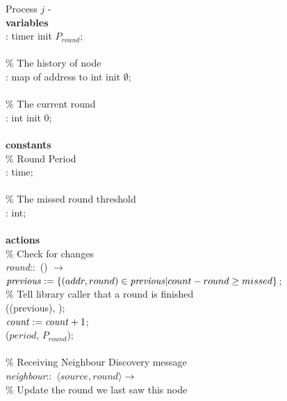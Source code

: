 \begin{figure}
  \centering
  \begin{boxedminipage}{\linewidth}
    \null Process $j$ - \\
    \null \textbf{variables}\\
    \null\qq {}: timer init $P_{round}$;\\~\\
    \null\qq \% The history of node\\
    \null\qq {}: map of address to int init $\emptyset$;\\~\\
    \null\qq \% The current round\\
    \null\qq {}: int init 0;\\~\\
    \null \textbf{constants}\\
    \null\qq \% Round Period\\
    \null\qq {}: time;\\~\\
    \null\qq \% The missed round threshold\\
    \null\qq {}: int;\\~\\
    \null \textbf{actions}\\
    \null\qq \% Check for changes\\
    \null\qq \emph{round}::~() $\rightarrow$\\
    \null\qq\qq $\mbox{\emph{previous}} \mathrel{:=} \{ (addr, round) \in \mbox{\emph{previous}} | count - round \geq missed \}$;\\
    \null\qq\qq \% Tell library caller that a round is finished\\
    \null\qq\qq {}((previous), );\\
    \null\qq\qq $\mbox{\emph{count}} \mathrel{:=} \mbox{\emph{count}} + 1$; \\
    \null\qq\qq {}($\mathit{period}$, $P_{round}$); \\~\\
    \null\qq \% Receiving Neighbour Discovery message\\
    \null\qq \emph{neighbour}::~$\langle source, round\rangle \rightarrow$\\
    \null\qq\qq \% Update the round we last saw this node\\

\end{boxedminipage}
\end{figure}
